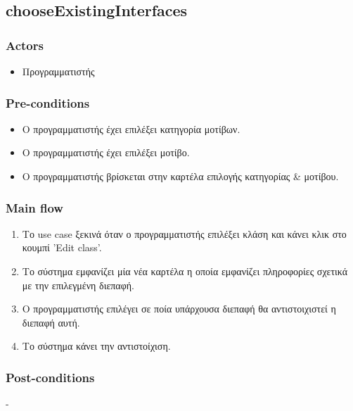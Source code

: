 \documentclass[../diploma_thesis.tex]{subfiles}
\begin{document}
\subsection{chooseExistingInterfaces}
\subsubsection{Actors}
\begin{itemize}
\item  Προγραμματιστής
\end{itemize}
\subsubsection{Pre-conditions}
\begin{itemize}
\item Ο προγραμματιστής έχει επιλέξει κατηγορία μοτίβων.
\item  Ο προγραμματιστής έχει επιλέξει μοτίβο.
\item Ο προγραμματιστής βρίσκεται στην καρτέλα επιλογής κατηγορίας \& μοτίβου.
\end{itemize}
\subsubsection{Main flow}
\begin{enumerate}
\item Το use case ξεκινά όταν ο προγραμματιστής επιλέξει κλάση και κάνει κλικ στο κουμπί 'Edit class'.
\item Το σύστημα εμφανίζει μία νέα καρτέλα η οποία εμφανίζει πληροφορίες σχετικά με την επιλεγμένη διεπαφή.
\item Ο προγραμματιστής επιλέγει σε ποία υπάρχουσα διεπαφή θα αντιστοιχιστεί η διεπαφή αυτή.
\item Το σύστημα κάνει την αντιστοίχιση.
\end{enumerate}
\subsubsection{Post-conditions}
-
\end{document}
